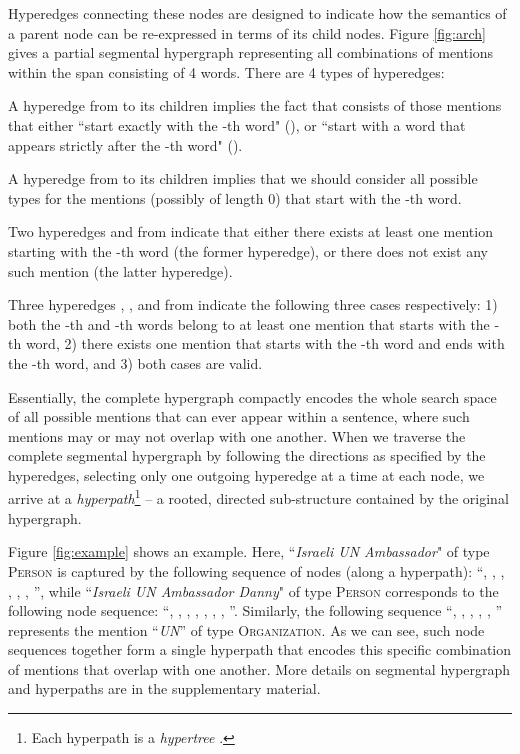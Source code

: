 \documentclass[11pt,a4paper]{article}
\theoremstyle{theorem}
\newcounter{Lcount}
\newcommand{\squishenum}{
\begin{list}{\arabic{Lcount}. }
{ \usecounter{Lcount}
\setlength{\itemsep}{0pt}
\setlength{\parsep}{0pt}
\setlength{\topsep}{0pt}
\setlength{\partopsep}{0pt}
\setlength{\leftmargin}{2em}
\setlength{\labelwidth}{1.5em}
\setlength{\labelsep}{0.5em} } }
\newcommand{\squishend}{
\end{list} }
\begin{document}
Hyperedges connecting these nodes are designed to indicate how the semantics of a parent node can be re-expressed in terms of its child nodes.
Figure \ref{fig:arch} gives a partial segmental hypergraph representing all combinations of mentions within the  span  consisting of 4 {\color{black}words}.
There are 4  types of hyperedges:
\squishenum
\item  A hyperedge  from  to its children implies the fact that  consists of those mentions that either ``start exactly with the -th word" (), or ``start with a word that appears strictly after the -th word" ().
\item  A hyperedge  from  to its children implies that we should consider all possible types for the mentions (possibly of length 0) that start with the -th word.
\item Two hyperedges  and  from  indicate that either there  exists at least one mention starting  with the -th word (the former hyperedge), or there does not exist any such mention (the latter hyperedge).
\item  Three hyperedges , , and  from  indicate the following three cases respectively: 1) both the -th and -th words belong to at least one mention that starts with the -th word, 2) there exists one mention that starts with the -th word and ends with the -th word, and 3) both cases are valid.
\squishend



Essentially, the complete hypergraph compactly encodes the whole search space of all possible mentions that can ever appear within a sentence, where such mentions may or may not overlap with one another.
When we traverse the complete segmental hypergraph by following the directions as specified by the hyperedges, selecting only one outgoing hyperedge at a time at each node, we arrive at a {\em hyperpath}\footnote{Each hyperpath is a {\em hypertree} \cite{brandstadt1998dually}.} -- a rooted, directed sub-structure contained by the original hypergraph.




Figure \ref{fig:example} shows an example. 
Here, ``\textit{Israeli UN Ambassador}" of type \textsc{Person} is captured by the following sequence of nodes (along a hyperpath):
 ``, , , , , , '', while 
 ``\textit{Israeli UN Ambassador Danny}" of type \textsc{Person} corresponds to the following node sequence: ``, , , , , , , ''.
Similarly, the following sequence ``, , , , , '' represents the mention ``\textit{UN}'' of type \textsc{Organization}.
As we can see, such node sequences together form a single hyperpath that encodes this specific combination of mentions that overlap with one another.
More details on segmental hypergraph and hyperpaths are in the supplementary material.
\end{document}

